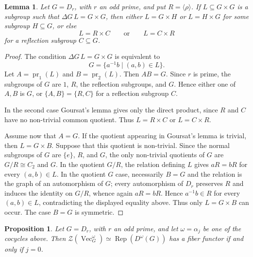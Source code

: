 \documentclass[12pt]{amsart}
\theoremstyle{plain}
\newtheorem{proposition}[theorem]{Proposition}
\newtheorem{lemma}[theorem]{Lemma}
\theoremstyle{definition} %
\theoremstyle{remark} %
\DeclareMathOperator{\VecCat}{Vec}
\newcommand{\Vect}[1]{\VecCat_{#1}}
\newcommand{\Rep}{\operatorname{Rep}}
\newcommand{\pr}{\operatorname{pr}}
\begin{document}
\begin{lemma}\label{lem:dihedral_goursat}
Let $G=D_r$, with $r$ an odd prime, and put $R=\langle \rho\rangle$. If $L\subseteq G\times G$ is a subgroup such that $\Delta G\,L=G\times G$, then either $L=G\times H$ or $L=H\times G$ for some subgroup $H\subseteq G$, or else
\[
L=R\times C
\qquad\text{or}\qquad
L=C\times R
\]
for a reflection subgroup $C\subseteq G$.
\end{lemma}

\begin{proof}
The condition $\Delta G\,L=G\times G$ is equivalent to
\[
G=\{a^{-1}b\mid (a,b)\in L\}.
\]
Let $A=\pr_1(L)$ and $B=\pr_2(L)$. Then $AB=G$. Since $r$ is prime, the subgroups of $G$ are $1$, $R$, the reflection subgroups, and $G$. Hence either one of $A,B$ is $G$, or $\{A,B\}=\{R,C\}$ for a reflection subgroup $C$.

In the second case Goursat's lemma gives only the direct product, since $R$ and $C$ have no non-trivial common quotient. Thus $L=R\times C$ or $L=C\times R$.

Assume now that $A=G$. If the quotient appearing in Goursat's lemma is trivial, then $L=G\times B$. Suppose that this quotient is non-trivial. Since the normal subgroups of $G$ are $\{e\}$, $R$, and $G$, the only non-trivial quotients of $G$ are $G/R\cong C_2$ and $G$. In the quotient $G/R$, the relation defining $L$ gives $aR=bR$ for every $(a,b)\in L$. In the quotient $G$ case, necessarily $B=G$ and the relation is the graph of an automorphism of $G$; every automorphism of $D_r$ preserves $R$ and induces the identity on $G/R$, whence again $aR=bR$. Hence $a^{-1}b\in R$ for every $(a,b)\in L$, contradicting the displayed equality above. Thus only $L=G\times B$ can occur. The case $B=G$ is symmetric.
\end{proof}

\begin{proposition}\label{prop:dihedral_twisted_doubles_no_fiber}
Let $G=D_r$, with $r$ an odd prime, and let $\omega=\alpha_j$ be one of the cocycles above. Then $\mathcal{Z}(\Vect{G}^{\omega})\simeq \Rep(D^\omega(G))$ has a fiber functor if and only if $j=0$.
\end{proposition}
\end{document}
